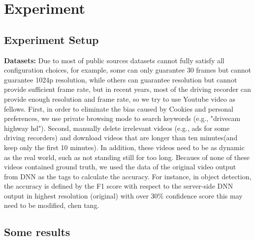 \section{Experiment}
\label{Section: experiment}

\subsection{Experiment Setup}
\textbf{Datasets:} Due to most of public sources datasets cannot fully satisfy all configuration choices, for example, some can only guarantee 30 frames but cannot guarantee 1024p resolution, while others can guarantee resolution but cannot provide sufficient frame rate, but in recent years, most of the driving recorder can provide enough resolution and frame rate, so we try to use Youtube video as fellows. First, in order to eliminate the bias caused by Cookies and personal preferences, we use private browsing mode to search keywords (e.g., "drivecam highway hd"). Second, manually delete irrelevant videos (e.g., ads for some driving recorders) and download videos that are longer than ten minutes(and keep only the first 10 minutes). In addition, these videos need to be as dynamic as the real world, such as not standing still for too long. Becaues of none of these videos contained ground truth, we used the data of the original video output from DNN as the tags to calculate the accuracy. For instance, in object detection, the accuracy is defined by the F1 score with respect to the server-side DNN output in highest resolution (original) with over 30$\%$ confidence score \textcolor{note}{this may need to be modified, chen tang}.
\subsection{Some results}

